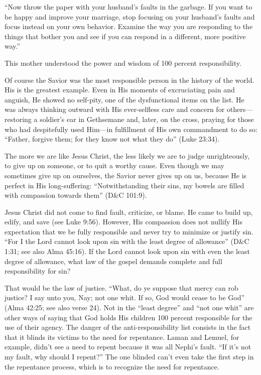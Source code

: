 \documentclass[letterpaper, 11pt]{report}
\newcommand{\intalkheader}[1]{
    \vspace{0.75em}
    \noindent{\normalsize\bfseries #1}
    \par\nopagebreak %
    \vspace{0.25em}
    \nopagebreak     %
}
\begin{document}
“Now throw the paper with your husband’s faults in the garbage. If you want to be happy and improve your marriage, stop focusing on your husband’s faults and focus instead on your own behavior. Examine the way you are responding to the things that bother you and see if you can respond in a different, more positive way.”

This mother understood the power and wisdom of 100 percent responsibility.

\intalkheader{The Greatest Example of All}
Of course the Savior was the most responsible person in the history of the world. His is the greatest example. Even in His moments of excruciating pain and anguish, He showed no self-pity, one of the dysfunctional items on the list. He was always thinking outward with His ever-selfless care and concern for others—restoring a soldier’s ear in Gethsemane and, later, on the cross, praying for those who had despitefully used Him—in fulfillment of His own commandment to do so: “Father, forgive them; for they know not what they do” (Luke 23:34).

The more we are like Jesus Christ, the less likely we are to judge unrighteously, to give up on someone, or to quit a worthy cause. Even though we may sometimes give up on ourselves, the Savior never gives up on us, because He is perfect in His long-suffering: “Notwithstanding their sins, my bowels are filled with compassion towards them” (D\&C 101:9).

Jesus Christ did not come to find fault, criticize, or blame. He came to build up, edify, and save (see Luke 9:56). However, His compassion does not nullify His expectation that we be fully responsible and never try to minimize or justify sin. “For I the Lord cannot look upon sin with the least degree of allowance” (D\&C 1:31; see also Alma 45:16). If the Lord cannot look upon sin with even the least degree of allowance, what law of the gospel demands complete and full responsibility for sin?

That would be the law of justice. “What, do ye suppose that mercy can rob justice? I say unto you, Nay; not one whit. If so, God would cease to be God” (Alma 42:25; see also verse 24). Not in the “least degree” and “not one whit” are other ways of saying that God holds His children 100 percent responsible for the use of their agency. The danger of the anti-responsibility list consists in the fact that it blinds its victims to the need for repentance. Laman and Lemuel, for example, didn’t see a need to repent because it was all Nephi’s fault. “If it’s not my fault, why should I repent?” The one blinded can’t even take the first step in the repentance process, which is to recognize the need for repentance.
\end{document}
